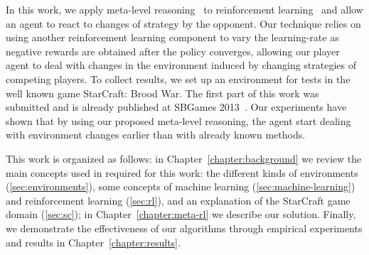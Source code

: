 In this work, we apply meta-level reasoning~\cite{cox2007metareasoning,ulam2008combining} to reinforcement learning~\cite{schweighofer2003meta} and allow an agent to react to changes of strategy by the opponent.
Our technique relies on using another reinforcement learning component to vary the learning-rate as negative rewards are obtained after the policy converges, allowing our player agent to deal with changes in the environment induced by changing strategies of competing players.
To collect results, we set up an environment for tests in the well known game StarCraft: Brood War.
The first part of this work was submitted and is already published at SBGames 2013~\cite{mypaper}.
Our experiments have shown that by using our proposed meta-level reasoning, the agent start dealing with environment changes earlier than with already known methods.

This work is organized as follows: 
in Chapter~\ref{chapter:background} we review the main concepts used in required for this work:
the different kinds of environments (\ref{sec:environments}), some concepts of machine learning (\ref{sec:machine-learning}) and reinforcement learning (\ref{sec:rl}), and an explanation of the StarCraft game domain (\ref{sec:sc}); 
in Chapter~\ref{chapter:meta-rl} we describe our solution.
Finally, we demonstrate the effectiveness of our algorithms through empirical experiments and results in Chapter~\ref{chapter:results}.